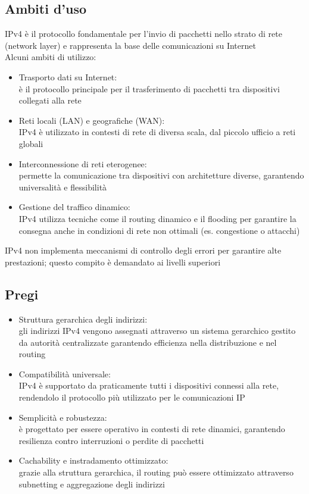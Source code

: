 \documentclass[10pt,oneside,a4paper]{article}
\begin{document}
\subsection{Ambiti d'uso}
IPv4 è il protocollo fondamentale per l'invio di pacchetti nello strato di rete (network layer) e rappresenta la base delle comunicazioni su Internet\\
Alcuni ambiti di utilizzo:
\begin{itemize}
\item Trasporto dati su Internet:\\
è il protocollo principale per il trasferimento di pacchetti tra dispositivi collegati alla rete
\item Reti locali (LAN) e geografiche (WAN):\\
IPv4 è utilizzato in contesti di rete di diversa scala, dal piccolo ufficio a reti globali
\item Interconnessione di reti eterogenee:\\
permette la comunicazione tra dispositivi con architetture diverse, garantendo universalità e flessibilità
\item Gestione del traffico dinamico:\\
IPv4 utilizza tecniche come il routing dinamico e il flooding per garantire la consegna anche in condizioni di rete non ottimali (es. congestione o attacchi)
\end{itemize}
IPv4 non implementa meccanismi di controllo degli errori per garantire alte prestazioni; questo compito è demandato ai livelli superiori
\subsection{Pregi}
\begin{itemize}
\item Struttura gerarchica degli indirizzi:\\
gli indirizzi IPv4 vengono assegnati attraverso un sistema gerarchico gestito da autorità centralizzate garantendo efficienza nella distribuzione e nel routing
\item Compatibilità universale:\\
IPv4 è supportato da praticamente tutti i dispositivi connessi alla rete, rendendolo il protocollo più utilizzato per le comunicazioni IP
\item Semplicità e robustezza:\\
è progettato per essere operativo in contesti di rete dinamici, garantendo resilienza contro interruzioni o perdite di pacchetti
\item Cachability e instradamento ottimizzato:\\
grazie alla struttura gerarchica, il routing può essere ottimizzato attraverso subnetting e aggregazione degli indirizzi
\end{itemize}
\end{document}
